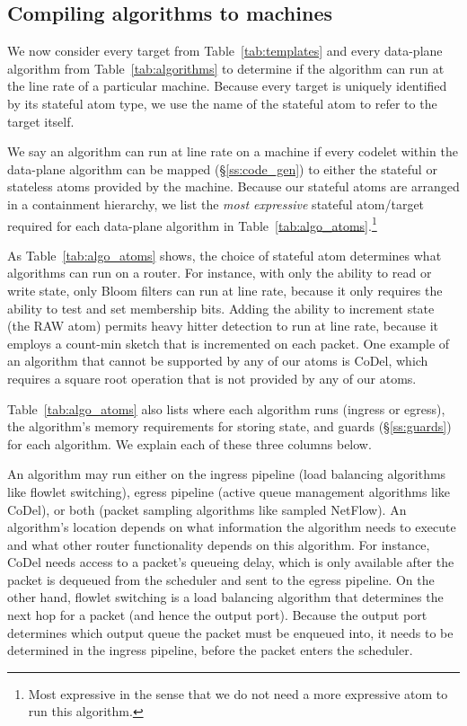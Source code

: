 \subsection{Compiling \pktlanguage algorithms to \absmachine machines}
\label{domino_ss:compiler}
We now consider every target from Table~\ref{tab:templates} and every
data-plane algorithm from Table~\ref{tab:algorithms} to determine if the
algorithm can run at the line rate of a particular \absmachine machine. Because
every target is uniquely identified by its stateful atom type, we use the name
of the stateful atom to refer to the target itself.

We say an algorithm can run at line rate on a \absmachine machine if every
codelet within the data-plane algorithm can be mapped (\S\ref{ss:code_gen}) to
either the stateful or stateless atoms provided by the \absmachine machine.
Because our stateful atoms are arranged in a containment hierarchy, we list the
\textit{most expressive} stateful atom/target required for each data-plane
algorithm in Table~\ref{tab:algo_atoms}.\footnote{Most expressive in the sense
that we do not need a more expressive atom to run this algorithm.}


As Table~\ref{tab:algo_atoms} shows, the choice of stateful atom determines
what algorithms can run on a router. For instance, with only the ability to
read or write state, only Bloom filters can run at line rate, because it only
requires the ability to test and set membership bits.  Adding the ability to
increment state (the RAW atom) permits heavy hitter detection to run at line
rate, because it employs a count-min sketch that is incremented on each packet.
One example of an algorithm that cannot be supported by any of our atoms is
CoDel, which requires a square root operation that is not provided by any of
our atoms.

Table~\ref{tab:algo_atoms} also lists where each algorithm runs (ingress or
egress), the algorithm's memory requirements for storing state, and guards
(\S\ref{ss:guards}) for each algorithm. We explain each of these three columns
below.

An algorithm may run either on the ingress pipeline (\eg load balancing
algorithms like flowlet switching), egress pipeline (\eg active queue
management algorithms like CoDel), or both (\eg packet sampling algorithms like
sampled NetFlow). An algorithm's location depends on what information the
algorithm needs to execute and what other router functionality depends on this
algorithm. For instance, CoDel needs access to a packet's queueing delay, which
is only available after the packet is dequeued from the scheduler and sent to
the egress pipeline. On the other hand, flowlet switching is a load balancing
algorithm that determines the next hop for a packet (and hence the output
port). Because the output port determines which output queue the packet must be
enqueued into, it needs to be determined in the ingress pipeline, before the
packet enters the scheduler.

